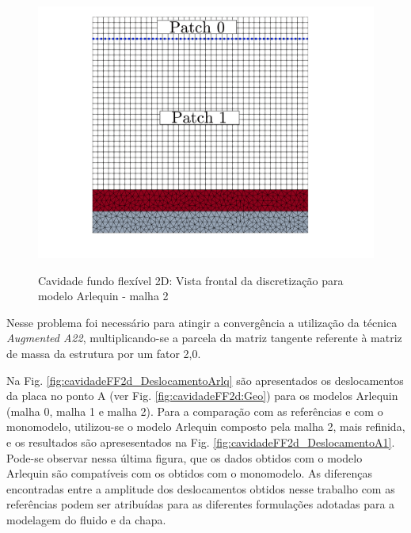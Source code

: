 \documentclass[tese_patricia]{subfiles}
\begin{document}
\begin{figure}[htb!]
	\centering
	{\includegraphics[scale=0.2,trim=0cm 2cm 0cm 0cm, clip=true]{Imagens/Cap7/Cav2dMesh.pdf}} 
	\caption{Cavidade fundo flexível 2D: Vista frontal da discretização para modelo Arlequin - malha 2}
	\label{fig:cavidadeFF2d:Malhas}
\end{figure}


Nesse problema foi necessário para atingir a convergência a utilização da técnica \textit{Augmented A22}, multiplicando-se a parcela da matriz tangente referente à matriz de massa da estrutura por um fator 2,0.

Na Fig. \ref{fig:cavidadeFF2d_DeslocamentoArlq} são apresentados os deslocamentos da placa no ponto A (ver Fig. \ref{fig:cavidadeFF2d:Geo}) para os modelos Arlequin (malha 0, malha 1 e malha 2). Para a comparação com as referências e com o monomodelo, utilizou-se o modelo Arlequin composto pela malha 2, mais refinida, e os resultados são apresesentados na Fig. \ref{fig:cavidadeFF2d_DeslocamentoA1}. Pode-se observar nessa última figura, que os dados obtidos com o modelo Arlequin são compatíveis com os obtidos com o monomodelo. As diferenças encontradas entre a amplitude dos deslocamentos obtidos nesse trabalho com as referências podem ser atribuídas para as diferentes formulações adotadas para a modelagem do fluido e da chapa.
\end{document}

